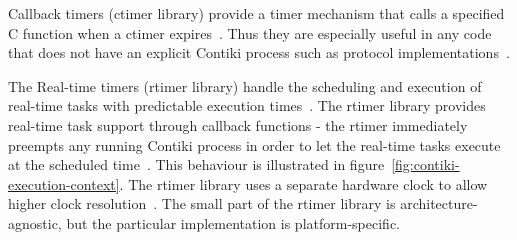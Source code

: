 Callback timers (ctimer library) provide a timer mechanism that calls a specified
C function when a ctimer expires~\cite{contiki-docs}.
Thus they are especially useful in any code that does not have an
explicit Contiki process such as protocol implementations~\cite{contiki-wiki-timers}.

The Real-time timers (rtimer library) handle the scheduling and execution of
real-time tasks with predictable execution times~\cite{contiki-docs}.
The rtimer library provides real-time task support through callback functions -
the rtimer immediately preempts any running Contiki process in order to let the real-time tasks
execute at the scheduled time~\cite{contiki-wiki-timers}.
This behaviour is illustrated in figure~\ref{fig:contiki-execution-context}.
The rtimer library uses a separate hardware clock
to allow higher clock resolution~\cite{contiki-wiki-timers}.
The small part of the rtimer library is architecture-agnostic,
but the particular implementation is platform-specific.
